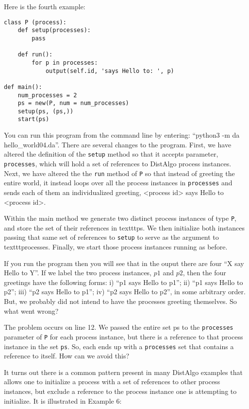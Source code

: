 \documentclass[11pt]{article}
\begin{document}
Here is the fourth example:

\begin{lstlisting}[caption={hello\_world04.da - Multiple Processes Referring to Each Other}, label={lst:hw04}]
class P (process):
    def setup(processes):
        pass

    def run():
        for p in processes:
            output(self.id, 'says Hello to: ', p)

def main():
    num_processes = 2
    ps = new(P, num = num_processes)
    setup(ps, (ps,))
    start(ps)  
\end{lstlisting}

\noindent You can run this program from the command line by entering:
``python3 -m da hello\_world04.da''. There are several changes to the program.
First, we have altered the definition of the \texttt{setup} method so that it
accepts parameter, \texttt{processes}, which will hold a set of references to
DistAlgo process instances. Next, we have altered the the \texttt{run} method
of \texttt{P} so that instead of greeting the entire world, it instead loops
over all the process instances in \texttt{processes} and sends each of them
an individualized greeting, <process id> says Hello to <process id>. 

Within the main method we generate two distinct process instances of type
\texttt{P}, and store the set of their references in texttt{ps}. We then
initialize both instances passing that same set of references to \texttt{setup}
to serve as the argument to texttt{processes}. Finally, we start those process
instances running as before.

If you run the program then you will see that in the ouput there are four
``X say Hello to Y''. If we label the two process instances, $p1$ and $p2$,
then the four greetings have the following forms: i) ``p1 says Hello to p1'';
ii) ``p1 says Hello to p2''; iii) ``p2 says Hello to p1'';
iv) ``p2 says Hello to p2'', in some arbitrary order. But, we probably did not
intend to have the processes greeting themselves. So what went wrong?

The problem occurs on line 12. We passed the entire set ps to the
\texttt{processes} parameter of \texttt{P} for each process instance, but there
is a reference to that process instance in the set \texttt{ps}. So, each ends
up with a \texttt{processes} set that contains a reference to itself. How can
we avoid this?

It turns out there is a common pattern present in many DistAlgo examples that
allows one to initialize a process with a set of references to other process
instances, but exclude a reference to the process instance one is attempting to
initialize. It is illustrated in Example 6:
\end{document}
